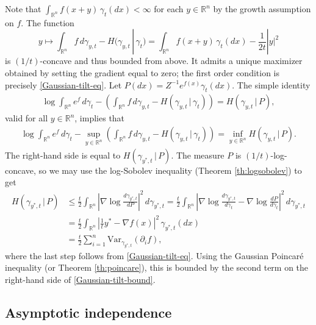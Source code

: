 \documentclass[11pt,reqno]{amsart}
\numberwithin{equation}{section}
\theoremstyle{definition}
\def\R{{\mathbb R}}
\def\Var{{\mathrm{Var}}}
\begin{document}
Note that $\int_{\R^n} f(x+y)\,\gamma_t(dx) < \infty$ for each $y \in \R^n$ by the growth assumption on $f$.
	The function 
	\begin{equation*}
		y \mapsto \int_{\R^n} f\,d\gamma_{y,t} - H(\gamma_{y,t}\,|\,\gamma_t)
		= \int_{\R^n} f(x+y)\,\gamma_t(dx) - \frac{1}{2t}|y|^2
	\end{equation*}
is $(1/t)$-concave and thus bounded from above. It admits a unique maximizer obtained by setting the gradient equal to zero; the first order condition is precisely \eqref{Gaussian-tilt-eq}.
	Let $P(dx)=Z^{-1}e^{f(x)}\gamma_t(dx)$.
	The simple identity
	\begin{align*}
		\log \int_{\R^n} e^{f}\,d\gamma_t - \left(\int_{\R^n} f\,d\gamma_{y,t} - H(\gamma_{y,t}\,|\,\gamma_t)\right) = H(\gamma_{y,t}\,|\,P),
	\end{align*}
	valid for all $y \in \R^n$, implies that
	\begin{align*}
		\log \int_{\R^n} e^{f}\,d\gamma_t - \sup_{y \in  \R^n }\left(\int_{\R^n} f\,d\gamma_{y,t} - H(\gamma_{y,t}\,|\,\gamma_t)\right) = \inf_{y \in \R^n}H(\gamma_{y,t}\,|\,P).
	\end{align*}
	The right-hand side is equal to $H(\gamma_{y^*,t}\,|\,P)$.
	The measure $P$ is $(1/t)$-log-concave, so we may use the log-Sobolev inequality (Theorem \ref{th:logsobolev}) to get
	\begin{align*}
		H(\gamma_{y^*,t}\,|\,P) &\le \frac{t}{2} \int_{\R^n} \left|\nabla \log\frac{d\gamma_{y^*,t}}{dP}\right|^2\,d\gamma_{y^*,t} = \frac{t}{2} \int_{\R^n} \left|\nabla \log\frac{d\gamma_{y^*,t}}{d\gamma_t}-\nabla \log\frac{dP}{d\gamma_t}\right|^2\,d\gamma_{y^*,t} \\
		&= \frac{t}{2}\int_{\R^n} \left| \frac{1}{t} y^* - \nabla f(x)\right|^2\,\gamma_{y^*,t}(dx) \\
		&= \frac{t}{2}\sum_{i=1}^n\Var_{\gamma_{y^*,t}}(\partial_i f),
	\end{align*}
	where the last step follows from \eqref{Gaussian-tilt-eq}.
Using the Gaussian Poincar\'e inequality (or Theorem \ref{th:poincare}), this is bounded by 
the second term on the right-hand side of \eqref{Gaussian-tilt-bound}. \hfill\qedsymbol



\subsection{Asymptotic independence} \label{subsec: proofs-asymp-indep}
\end{document}

